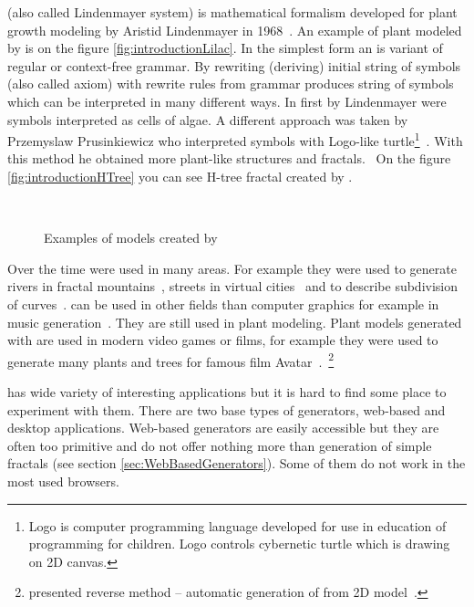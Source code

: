 
\label{sec:Introduction}

\lsystem (also called Lindenmayer system) is mathematical formalism developed for plant growth modeling by Aristid Lindenmayer in 1968~\cite{Lin68}.
An example of plant modeled by \lsystem is on the figure \ref{fig:introductionLilac}.
In the simplest form an \lsystem is variant of regular or \mbox{context-free} grammar.
By rewriting (deriving) initial string of symbols (also called axiom) with rewrite rules from grammar \lsystem produces string of symbols which can be interpreted in many different ways.
In first \lsystems by Lindenmayer were symbols interpreted as cells of algae.
A different approach was taken by Przemyslaw Prusinkiewicz who interpreted \lsystem symbols with \mbox{Logo-like} turtle\footnote{
	Logo is computer programming language developed for use in education of programming for children.
	Logo controls cybernetic turtle which is drawing on 2D canvas.}~\cite{Pru85}.
With this method he obtained more plant-like structures and fractals.~\cite{CD93}
On the figure \ref{fig:introductionHTree} you can see H-tree fractal created by \lsystem.

\begin{figure}[ht]
	\centering
	 ~
	\caption{Examples of models created by \lsystem}
\end{figure}


Over the time \lsystems were used in many areas.
For example they were used to generate rivers in fractal mountains~\cite{PH93}, streets in virtual cities~\cite{PM01} and to describe subdivision of curves~\cite{PSSK03}.
\lsystems can be used in other fields than computer graphics for example in music generation~\cite{HCJ99, Man06}.
They are still used in plant modeling.
Plant models generated with \lsystems are used in modern video games or films, for example they were used to generate many plants and trees for famous film Avatar~\cite{Wor08, Dun10}.~\footnote{\citeauthor{SBM10} presented reverse method -- automatic generation of \lsystems from 2D model~\cite{SBM10}.}

\lsystems has wide variety of interesting applications but it is hard to find some place to experiment with them.
There are two base types of \lsystem generators, web-based and desktop applications.
Web-based \lsystem generators are easily accessible but they are often too primitive and do not offer nothing more than generation of simple fractals (see section \ref{sec:WebBasedGenerators}).
Some of them do not work in the most used browsers.

